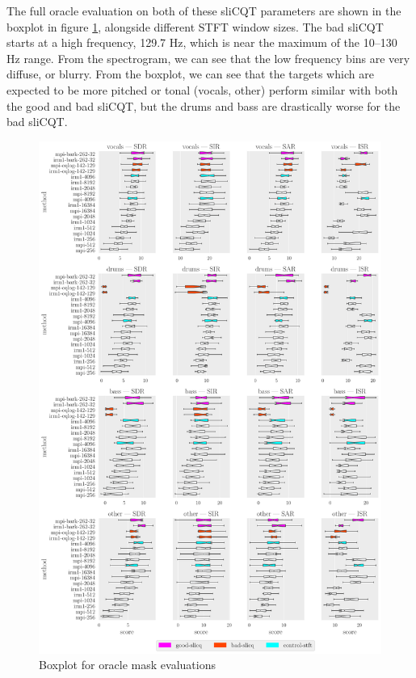 \documentclass[report.tex]{subfiles}
\begin{document}
The full oracle evaluation on both of these sliCQT parameters are shown in the boxplot in figure \ref{fig:oraclebssboxplot}, alongside different STFT window sizes. The bad sliCQT starts at a high frequency, 129.7 Hz, which is near the maximum of the 10--130 Hz range. From the spectrogram, we can see that the low frequency bins are very diffuse, or blurry. From the boxplot, we can see that the targets which are expected to be more pitched or tonal (vocals, other) perform similar with both the good and bad sliCQT, but the drums and bass are drastically worse for the bad sliCQT.

\begin{figure}[ht]
	\centering
	\includegraphics[width=\textwidth]{./images-bss/oracle_boxplot.pdf}
	\caption{Boxplot for oracle mask evaluations}
	\label{fig:oraclebssboxplot}
\end{figure}
\end{document}
